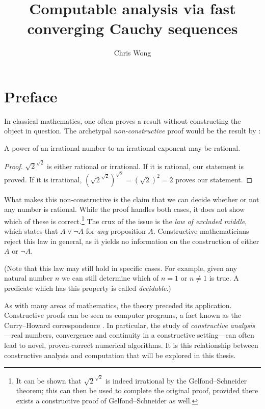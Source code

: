 \documentclass[leqno]{report}
\begin{document}
\author{Chris Wong}
\title{Computable analysis via fast converging Cauchy sequences}
\maketitle

\chapter*{Preface}

In classical mathematics, one often proves a result without constructing the object in question. The archetypal \textit{non-constructive} proof would be the result by \citet{jarden1953simple}:

\begin{Theorem}
    A power of an irrational number to an irrational exponent may be rational.
\end{Theorem}

\begin{proof}
    $\sqrt{2}^{\sqrt{2}}$ is either rational or irrational. If it is rational, our statement is proved. If it is irrational, $(\sqrt{2}^{\sqrt{2}})^{\sqrt{2}} = (\sqrt{2})^2 = 2$ proves our statement.
\end{proof}

What makes this non-constructive is the claim that we can decide whether or not any number is rational. While the proof handles both cases, it does not show which of these is correct.\footnote{It can be shown that $\sqrt{2}^{\sqrt{2}}$ is indeed irrational by the Gelfond--Schneider theorem; this can then be used to complete the original proof, provided there exists a constructive proof of Gelfond--Schneider as well.} The crux of the issue is the \textit{law of excluded middle}, which states that $A \vee \neg A$ for \emph{any} proposition $A$. Constructive mathematicians reject this law in general, as it yields no information on the construction of either $A$ or $\neg A$.

(Note that this law may still hold in specific cases. For example, given any natural number $n$ we can still determine which of $n = 1$ or $n \neq 1$ is true. A predicate which has this property is called \textit{decidable}.)

As with many areas of mathematics, the theory preceded its application. Constructive proofs can be seen as computer programs, a fact known as the Curry--Howard correspondence \citep{wadler2015}. In particular, the study of \textit{constructive analysis}---real numbers, convergence and continuity in a constructive setting---can often lead to novel, proven-correct numerical algorithms. It is this relationship between constructive analysis and computation that will be explored in this thesis.
\end{document}
